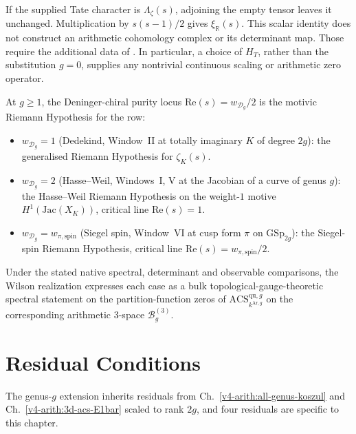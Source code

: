If the supplied Tate character is \(\Lambda_\zeta(s)\), adjoining
the empty tensor leaves it unchanged. Multiplication by
\(s(s-1)/2\) gives \(\xi_{\mathbb R}(s)\).
This scalar identity does not construct an arithmetic cohomology
complex or its determinant map. Those require the additional data
of . In particular, a choice of
\(H_T\), rather than the substitution \(g=0\), supplies any
nontrivial continuous scaling or arithmetic zero operator.
\begin{remark}
\label{v4-arith:w9-r6:rem:hw-ss-rh}
At \(g\geq 1\), the Deninger-chiral purity locus
\(\mathrm{Re}(s)=w_{\mathcal{D}_{g}}/2\) is the motivic Riemann
Hypothesis for the row:
\begin{itemize}
\item \(w_{\mathcal{D}_{g}}=1\) (Dedekind, Window~II at totally imaginary
\(K\) of degree \(2g\)): the generalised Riemann Hypothesis for
\(\zeta_{K}(s)\).
\item \(w_{\mathcal{D}_{g}}=2\) (Hasse--Weil, Windows~I, V at the Jacobian
of a curve of genus \(g\)): the Hasse--Weil Riemann Hypothesis on the
weight-\(1\) motive \(H^{1}(\mathrm{Jac}(X_{K}))\), critical line
\(\mathrm{Re}(s)=1\).
\item \(w_{\mathcal{D}_{g}}=w_{\pi,\mathrm{spin}}\) (Siegel spin, Window~VI at cusp form
\(\pi\) on \(\mathrm{GSp}_{2g}\)): the Siegel-spin Riemann Hypothesis,
critical line \(\mathrm{Re}(s)=w_{\pi,\mathrm{spin}}/2\).
\end{itemize}
Under the stated native spectral, determinant and observable
comparisons, the Wilson realization expresses each case as a
bulk topological-gauge-theoretic spectral statement on the
partition-function zeros of \(\mathrm{ACS}^{\mathrm{qu},g}_{k^{\mathrm{Ar},g}}\)
on the corresponding arithmetic 3-space \(\mathcal{B}_{g}^{(3)}\).
\end{remark}

\section{Residual Conditions}
\label{v4-arith:w9-r6:residual}

The genus-\(g\) extension inherits residuals from
Ch.~\ref{v4-arith:all-genus-koszul} and Ch.~\ref{v4-arith:3d-acs-E1bar}
scaled to rank \(2g\), and four residuals are specific to this chapter.

